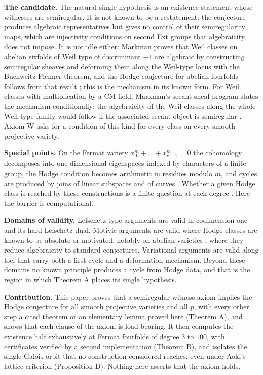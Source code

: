 \documentclass[10pt,twocolumn]{article}
\begin{document}
\textbf{The candidate.} The natural single hypothesis is an existence
statement whose witnesses are semiregular. It is not known to be a
restatement: the conjecture produces algebraic representatives but gives
no control of their semiregularity maps, which are injectivity
conditions on second Ext groups that algebraicity does not impose. It is
not idle either: Markman proves that Weil classes on abelian sixfolds of
Weil type of discriminant \(-1\) are algebraic by constructing
semiregular sheaves and deforming them along the Weil-type locus with
the Buchweitz-Flenner theorem, and the Hodge conjecture for abelian
fourfolds follows from that result \cite{markman2025}; this is the
mechanism in its known form. For Weil classes with multiplication by a
CM field, Markman's secant-sheaf program states the mechanism
conditionally: the algebraicity of the Weil classes along the whole
Weil-type family would follow if the associated secant object is
semiregular \cite{markman2025b}. Axiom W asks for a condition of this
kind for every class on every smooth projective variety.

\textbf{Special points.} On the Fermat variety
\(x_0^m+\dots+x_{r+1}^m=0\) the cohomology decomposes into
one-dimensional eigenspaces indexed by characters of a finite group, the
Hodge condition becomes arithmetic in residues modulo \(m\), and cycles
are produced by joins of linear subspaces and of curves
\cite{shioda1979,sk1979,ran1980,aoki1987}. Whether a given Hodge class
is reached by these constructions is a finite question at each degree
\cite{dasilva2021,jumagulov2026}. Here the barrier is computational.

\textbf{Domains of validity.} Lefschetz-type arguments are valid in
codimension one and its hard Lefschetz dual. Motivic arguments are valid
where Hodge classes are known to be absolute or motivated, notably on
abelian varieties \cite{deligne1982,andre1996}, where they reduce
algebraicity to standard conjectures. Variational arguments are valid
along loci that carry both a first cycle and a deformation mechanism.
Beyond these domains no known principle produces a cycle from Hodge
data, and that is the region in which Theorem A places its single
hypothesis.

\textbf{Contribution.} This paper proves that a semiregular witness
axiom implies the Hodge conjecture for all smooth projective varieties
and all \(p\), with every other step a cited theorem or an elementary
lemma proved here (Theorem A), and shows that each clause of the axiom
is load-bearing. It then computes the existence half exhaustively at
Fermat fourfolds of degree \(3\) to \(100\), with certificates verified
by a second implementation (Theorem B), and isolates the single Galois
orbit that no construction considered reaches, even under Aoki's lattice
criterion (Proposition D). Nothing here asserts that the axiom holds.
\end{document}
